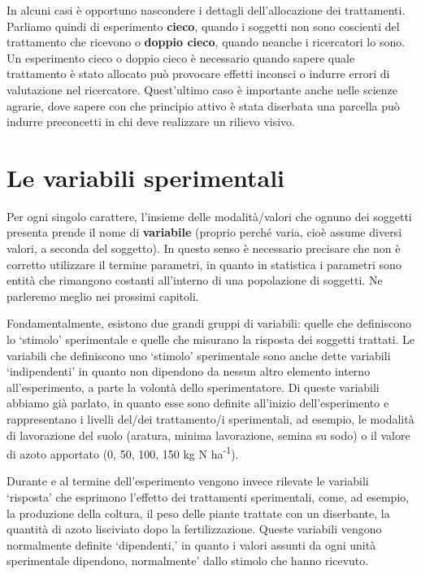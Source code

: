 \documentclass[a4paper,12pt,oneside]{book}
\begin{document}
In alcuni casi è opportuno nascondere i dettagli dell'allocazione dei trattamenti. Parliamo quindi di esperimento \textbf{cieco}, quando i soggetti non sono coscienti del trattamento che ricevono o \textbf{doppio cieco}, quando neanche i ricercatori lo sono. Un esperimento cieco o doppio cieco è necessario quando sapere quale trattamento è stato allocato può provocare effetti inconsci o indurre errori di valutazione nel ricercatore. Quest'ultimo caso è importante anche nelle scienze agrarie, dove sapere con che principio attivo è stata diserbata una parcella può indurre preconcetti in chi deve realizzare un rilievo visivo.

\hypertarget{le-variabili-sperimentali}{%
\section{Le variabili sperimentali}\label{le-variabili-sperimentali}}

Per ogni singolo carattere, l'insieme delle modalità/valori che ognuno dei soggetti presenta prende il nome di \textbf{variabile} (proprio perché varia, cioè assume diversi valori, a seconda del soggetto). In questo senso è necessario precisare che non è corretto utilizzare il termine parametri, in quanto in statistica i parametri sono entità che rimangono costanti all'interno di una popolazione di soggetti. Ne parleremo meglio nei prossimi capitoli.

Fondamentalmente, esistono due grandi gruppi di variabili: quelle che definiscono lo `stimolo' sperimentale e quelle che misurano la risposta dei soggetti trattati. Le variabili che definiscono uno `stimolo' sperimentale sono anche dette variabili `indipendenti' in quanto non dipendono da nessun altro elemento interno all'esperimento, a parte la volontà dello sperimentatore. Di queste variabili abbiamo già parlato, in quanto esse sono definite all'inizio dell'esperimento e rappresentano i livelli del/dei trattamento/i sperimentali, ad esempio, le modalità di lavorazione del suolo (aratura, minima lavorazione, semina su sodo) o il valore di azoto apportato (0, 50, 100, 150 kg N ha\textsuperscript{-1}).

Durante e al termine dell'esperimento vengono invece rilevate le variabili `risposta' che esprimono l'effetto dei trattamenti sperimentali, come, ad esempio, la produzione della coltura, il peso delle piante trattate con un diserbante, la quantità di azoto lisciviato dopo la fertilizzazione. Queste variabili vengono normalmente definite `dipendenti,' in quanto i valori assunti da ogni unità sperimentale dipendono, normalmente' dallo stimolo che hanno ricevuto.
\end{document}
